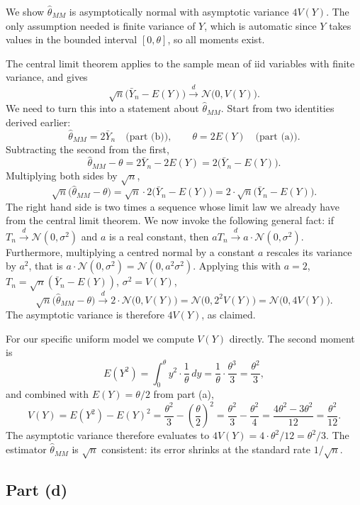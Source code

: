 We show $\widehat\theta_{MM}$ is asymptotically normal with asymptotic variance $4 V(Y)$. The only assumption needed is finite variance of $Y$, which is automatic since $Y$ takes values in the bounded interval $[0, \theta]$, so all moments exist.

The central limit theorem applies to the sample mean of iid variables with finite variance, and gives
\[
\sqrt{n}\bigl(\bar Y_n - E(Y)\bigr) \overset{d}{\longrightarrow} \mathcal{N}\bigl(0, V(Y)\bigr).
\]
We need to turn this into a statement about $\widehat\theta_{MM}$. Start from two identities derived earlier:
\[
\widehat\theta_{MM} = 2 \bar Y_n \quad \text{(part (b))}, \qquad \theta = 2 E(Y) \quad \text{(part (a))}.
\]
Subtracting the second from the first,
\[
\widehat\theta_{MM} - \theta = 2 \bar Y_n - 2 E(Y) = 2\bigl(\bar Y_n - E(Y)\bigr).
\]
Multiplying both sides by $\sqrt n$,
\[
\sqrt{n}\bigl(\widehat\theta_{MM} - \theta\bigr) = \sqrt{n} \cdot 2\bigl(\bar Y_n - E(Y)\bigr) = 2 \cdot \sqrt{n}\bigl(\bar Y_n - E(Y)\bigr).
\]
The right hand side is two times a sequence whose limit law we already have from the central limit theorem. We now invoke the following general fact: if $T_n \overset{d}{\longrightarrow} \mathcal{N}(0, \sigma^2)$ and $a$ is a real constant, then $a T_n \overset{d}{\longrightarrow} a \cdot \mathcal{N}(0, \sigma^2)$. Furthermore, multiplying a centred normal by a constant $a$ rescales its variance by $a^2$, that is $a \cdot \mathcal{N}(0, \sigma^2) = \mathcal{N}(0, a^2 \sigma^2)$. Applying this with $a = 2$, $T_n = \sqrt n (\bar Y_n - E(Y))$, $\sigma^2 = V(Y)$,
\[
\sqrt{n}\bigl(\widehat\theta_{MM} - \theta\bigr) \overset{d}{\longrightarrow} 2 \cdot \mathcal{N}\bigl(0, V(Y)\bigr) = \mathcal{N}\bigl(0, 2^2 V(Y)\bigr) = \mathcal{N}\bigl(0, 4 V(Y)\bigr).
\]
The asymptotic variance is therefore $4 V(Y)$, as claimed.

For our specific uniform model we compute $V(Y)$ directly. The second moment is
\[
E(Y^2) = \int_0^\theta y^2 \cdot \frac{1}{\theta}\, dy = \frac{1}{\theta} \cdot \frac{\theta^3}{3} = \frac{\theta^2}{3},
\]
and combined with $E(Y) = \theta/2$ from part (a),
\[
V(Y) = E(Y^2) - E(Y)^2 = \frac{\theta^2}{3} - \left(\frac{\theta}{2}\right)^2 = \frac{\theta^2}{3} - \frac{\theta^2}{4} = \frac{4 \theta^2 - 3 \theta^2}{12} = \frac{\theta^2}{12}.
\]
The asymptotic variance therefore evaluates to $4 V(Y) = 4 \cdot \theta^2/12 = \theta^2/3$. The estimator $\widehat\theta_{MM}$ is $\sqrt n$ consistent: its error shrinks at the standard rate $1/\sqrt n$.

\subsection*{Part (d)}

